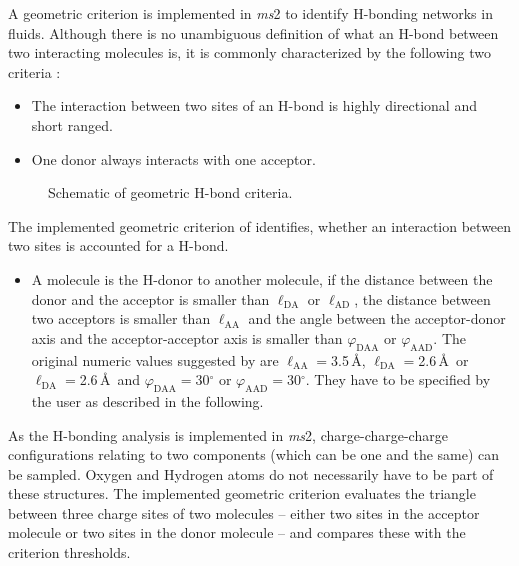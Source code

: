 A geometric criterion is implemented in \textit{ms}2 to identify H-bonding networks in fluids. Although there is no unambiguous definition of what an H-bond between two interacting molecules is, it is commonly characterized by the following two criteria \parencite{Langenbach2015,Arunan2011}:
\begin{itemize}
	\item The interaction between two sites of an H-bond is highly directional and short ranged.
	\item One donor always interacts with one acceptor.
\end{itemize}
\begin{figure}[htb]
	\centering
	\def\svgwidth{\textwidth}
	 
	\caption{Schematic of geometric H-bond criteria.}
	\label{fig:Hbonding}
\end{figure}
The implemented geometric criterion of \parencite{Haughney1987} identifies, whether an interaction between two sites is accounted for a H-bond. 
\begin{itemize}
	\item[ ]A molecule is the H-donor to another molecule, if the distance between the donor and the acceptor is smaller than $\ell_\mathrm{DA}$ or $\ell_\mathrm{AD}$, the distance between two acceptors is smaller than $\ell_\mathrm{AA}$ and the angle between the acceptor-donor axis and the acceptor-acceptor axis is smaller than $\varphi_\mathrm{DAA}$ or $\varphi_\mathrm{AAD}$. The original numeric values suggested by \textit{\citeauthor{Haughney1987}} are $\ell_\mathrm{AA}=$3.5\,\AA, $\ell_\mathrm{DA}=$2.6\,\AA \ or $\ell_\mathrm{DA}=$2.6\,\AA \ and $\varphi_\mathrm{DAA}=$30$^\circ$ or $\varphi_\mathrm{AAD}=$30$^\circ$. They have to be specified by the user as described in the following.
\end{itemize}
As the H-bonding analysis is implemented in \textit{ms}2, charge-charge-charge configurations relating to two components (which can be one and the same) can be sampled. Oxygen and Hydrogen atoms do not necessarily have to be part of these structures. The implemented geometric criterion evaluates the triangle between three charge sites of two molecules -- either two sites in the acceptor molecule or two sites in the donor molecule -- and compares these with the criterion thresholds. 

